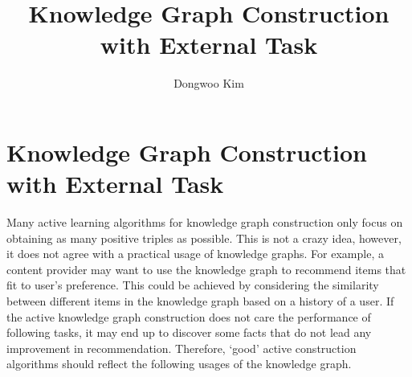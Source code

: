 \documentclass{article} %
\title{Knowledge Graph Construction with External Task }
\author{
Dongwoo Kim
}
\theoremstyle{definition}
\begin{document}
\maketitle


\section{Knowledge Graph Construction with External Task}

Many active learning algorithms for knowledge graph construction only focus on obtaining as many positive triples as possible. This is not a crazy idea, however, it does not agree with a practical usage of knowledge graphs. For example, a content provider may want to use the knowledge graph to recommend items that fit to user's preference. This could be achieved by considering the similarity between different items in the knowledge graph based on a history of a user. If the active knowledge graph construction does not care the performance of following tasks, it may end up to discover some facts that do not lead any improvement in recommendation. Therefore, `good' active construction algorithms should reflect the following usages of the knowledge graph.
\end{document}

